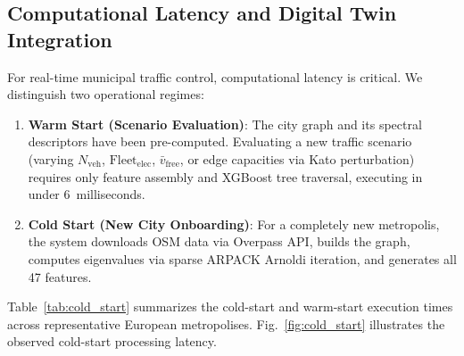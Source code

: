 \documentclass[journal]{IEEEtran}
\begin{document}
\subsection{Computational Latency and Digital Twin Integration}
For real-time municipal traffic control, computational latency is critical. We distinguish two operational regimes:
\begin{enumerate}
    \item \textbf{Warm Start (Scenario Evaluation)}: The city graph and its spectral descriptors have been pre-computed. Evaluating a new traffic scenario (varying $N_{\text{veh}}$, $\text{Fleet}_{\text{elec}}$, $\bar{v}_{\text{free}}$, or edge capacities via Kato perturbation) requires only feature assembly and XGBoost tree traversal, executing in under $6$~milliseconds.
    \item \textbf{Cold Start (New City Onboarding)}: For a completely new metropolis, the system downloads OSM data via Overpass API, builds the graph, computes eigenvalues via sparse ARPACK Arnoldi iteration, and generates all 47 features.
\end{enumerate}

Table~\ref{tab:cold_start} summarizes the cold-start and warm-start execution times across representative European metropolises. Fig.~\ref{fig:cold_start} illustrates the observed cold-start processing latency.

\begin{table}[htbp]
\caption{End-to-End Computational Latency and Resource Breakdown (Raw OSM Cartographic Nodes)}
\label{tab:cold_start}
\centering
{}
\end{table}
\end{document}
